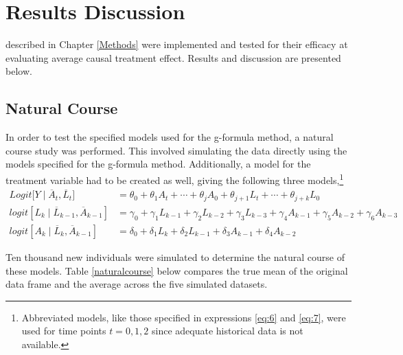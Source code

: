 
\chapter{Results Discussion} \label{Results}

 described in Chapter \ref{Methods} were implemented and tested for their efficacy at evaluating average causal treatment effect.  Results and discussion are presented below.  

\section{Natural Course} 
In order to test the specified models used for the g-formula method, a natural course study was performed.  This involved simulating the data directly using the models specified for the g-formula method.  Additionally, a model for the treatment variable had to be created as well, giving the following three models,\footnote{Abbreviated models, like those specified in expressions \ref{eq:6} and \ref{eq:7}, were used for time points $t=0,1,2$ since adequate historical data is not available.} 
\begin{align} 
Logit \big[Y \mid \overline{A}_t, \overline{L}_t \big] &= \theta_{0} + \theta_1 A_{t} + \cdots + \theta_j A_0 + \theta_{j+1} L_t + \cdots + \theta_{j+k} L_0  \\ 
logit[L_k \mid \overline{L}_{k-1}, \overline{A}_{k-1}] &= \gamma_0 + \gamma_1 L_{k-1} + \gamma_2 L_{k-2} + \gamma_3 L_{k-3}  + \gamma_4 A_{k-1} + \gamma_5 A_{k-2} + \gamma_6 A_{k-3} \\ 
logit[A_k \mid \overline{L}_{k}, \overline{A}_{k-1}] &= \delta_0 + \delta_1 L_{k} + \delta_2 L_{k-1} + \delta_3 A_{k-1} + \delta_4 A_{k-2} 
\end{align} 

Ten thousand new individuals were simulated to determine the natural course of these models.  Table \ref{naturalcourse} below compares the true mean of the original data frame and the average across the five simulated datasets.  


